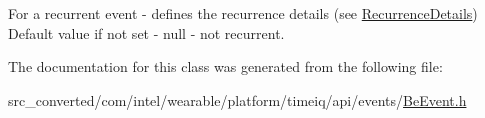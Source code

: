 For a recurrent event -\/ defines the recurrence details (see \hyperlink{interface_recurrence_details}{Recurrence\+Details}) Default value if not set -\/ null -\/ not recurrent. 



The documentation for this class was generated from the following file\+:\begin{DoxyCompactItemize}
\item 
src\+\_\+converted/com/intel/wearable/platform/timeiq/api/events/\hyperlink{_be_event_8h}{Be\+Event.\+h}\end{DoxyCompactItemize}
